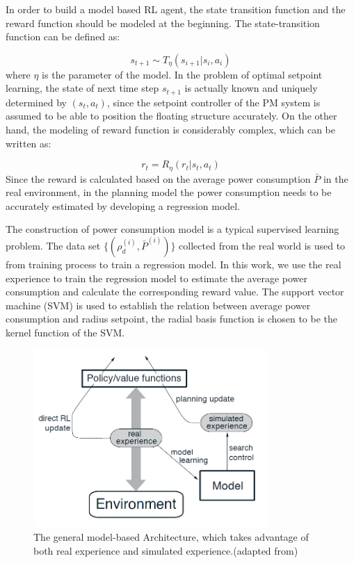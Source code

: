 \begin{sloppypar}
In order to build a model based RL agent, the state transition function and the reward function should be modeled at the beginning. The state-transition function can be defined as:

\begin{equation}
s_{t+1} \sim T_{\eta}(s_{i+1}|s_i,a_i)
\end{equation}
where $\eta$ is the parameter of the model. In the problem of optimal setpoint learning, the state of next time step $s_{t+1}$ is actually known and uniquely determined by $(s_t, a_t)$, since the setpoint controller of the PM system is assumed to be able to position the floating structure accurately.
On the other hand, the modeling of reward function is considerably complex, which can be written as:

\begin{equation}
r_t = {R}_{\eta}(r_t|s_t,a_t)
\end{equation}
Since the reward is calculated based on the average power consumption $\bar{P}$ in the real environment, in the planning model the power consumption needs to be accurately estimated by developing a regression model.

The construction of power consumption model is a typical supervised learning problem. The data set $\{(\rho^{(i)}_d, \bar{P}^{(i)})\}$ collected from the real world is used to from training process
to train a regression model. In this work, we use the real experience to train the regression model to estimate the average power consumption and calculate the corresponding reward value. The support vector machine (SVM) is used to establish the relation between average power consumption and radius setpoint, the radial basis function is chosen to be the kernel function of the SVM.

\begin{figure}[!htp]
	\centering
	\includegraphics[width=3.5in]{Images/dyna_Q.png}
	\caption{The general model-based Architecture, which takes advantage of both real experience and simulated experience.(adapted from\cite{sutton1999reinforcement})}
	\label{fig:dyna}
\end{figure}


\end{sloppypar}
